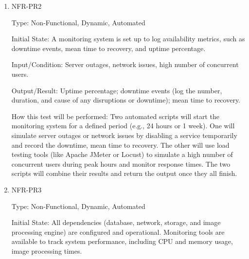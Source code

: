 \documentclass[12pt, titlepage]{article}
\begin{document}
\begin{enumerate}
\begin{enumerate}
Type: Non-Functional, Dynamic, Automated

Initial State: User is logged in. Standard chest X-ray images are available for testing in PNG/JPG format (depending on system requirements).

Input/Condition: Automated test script interacts with the system.

Output/Result: Percentage of the number of the chest X-ray images that are analyzed correctly.

How this test will be performed: The test script will upload a chest X-ray image through the interface. It will monitor the system to ensure it processes and analyzes the image. The moment the results or report are displayed or the system indicates completion, it checks the timing (30 seconds). The process is repeated multiple times (at least 5 trials) to account for variations in processing time.

\item{NFR-PR2}\label{NFR-PR2}

Type: Non-Functional, Dynamic, Automated

Initial State: A monitoring system is set up to log availability metrics, such as downtime events, mean time to recovery, and uptime percentage.

Input/Condition: Server outages, network issues, high number of concurrent users.

Output/Result: Uptime percentage; downtime events (log the number, duration, and cause of any disruptions or downtime); mean time to recovery.

How this test will be performed: Two automated scripts will start the monitoring system for a defined period (e.g., 24 hours or 1 week). One will simulate server outages or network issues by disabling a service temporarily and record the downtime, mean time to recovery. The other will use load testing tools (like Apache JMeter or Locust) to simulate a high number of concurrent users during peak hours and monitor response times. The two scripts will combine their results and return the output once they all finish.

\item{NFR-PR3}\label{NFR-PR3}

Type: Non-Functional, Dynamic, Automated

Initial State: All dependencies (database, network, storage, and image processing engine) are configured and operational. Monitoring tools are available to track system performance, including CPU and memory usage, image processing times.


\end{enumerate}
\end{enumerate}
\end{document}

